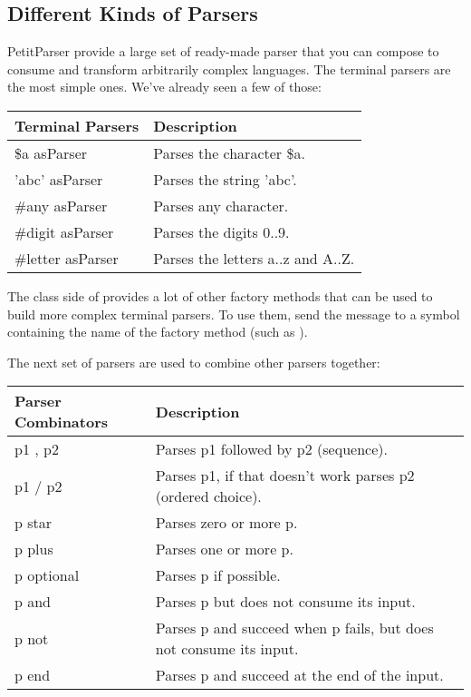 \documentclass[a4paper,10pt,twoside]{book}
\begin{document}
\subsection{Different Kinds of Parsers}

PetitParser provide a large set of ready-made parser that you can
compose to consume and transform arbitrarily complex languages. The
terminal parsers are the most simple ones. We've already seen a few of
those:

\begin{tabular}{ll}
\textbf{Terminal Parsers} 	& \textbf{Description}\\
\midrule
\$a asParser      & 	Parses the character \$a.\\
'abc' asParser   & 	Parses the string 'abc'.\\
\#any asParser    &	Parses any character.\\
\#digit asParser  & 	Parses the digits 0..9.\\
\#letter asParser & 	Parses the letters a..z and A..Z.\\
\end{tabular}

The class side of  provides a lot of other
factory methods that can be used to build more complex terminal
parsers. To use them, send the message  to a symbol
containing the name of the factory method (such as 
).

The next set of parsers are used to combine other parsers together:

\begin{tabular}{lp{}}
\textbf{Parser Combinators} & \textbf{Description}\\
\midrule
p1 , p2     & Parses p1 followed by p2 (sequence).\\
p1 / p2     & Parses p1, if that doesn't work parses p2 (ordered choice).\\
p star      & Parses zero or more p.\\
p plus      & Parses one or more p.\\
p optional  & Parses p if possible.\\
p and 	    & Parses p but does not consume its input.\\
p not       & Parses p and succeed when p fails, but does not consume its input.\\
p end 	    & Parses p and succeed at the end of the input.  \\
\end{tabular}
\end{document}

